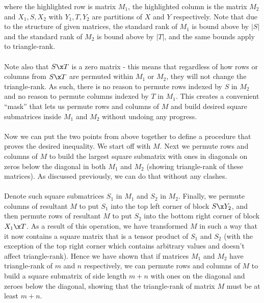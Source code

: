 \documentclass{article}
\begin{document}
\begin{enumerate}
\begin{enumerate}
            where the highlighted row is matrix $M_1$, the highlighted column
            is the matrix $M_2$ and $X_1, S, X_2$ with $Y_1, T, Y_2$ are
            partitions of $X$ and $Y$ respectively. Note that due to the
            structure of given matrices, the standard rank of $M_1$ is bound
            above by $|S|$ and the standard rank of $M_2$ is bound above by
            $|T|$, and the same bounds apply to triangle-rank.
            \\\\
            Note also that $S \x T$ is a zero matrix - this means that
            regardless of how rows or columns from $S \x T$ are permuted within
            $M_1$ or $M_2$, they will not change the triangle-rank. As such,
            there is no reason to permute rows indexed by $S$ in $M_2$ and no
            reason to permute columns indexed by $T$ in $M_1$. This creates a
            convenient ``mask'' that lets us permute rows and columns of $M$
            and build desired square submatrices inside $M_1$ and $M_2$ without 
            undoing any progress.
            \\\\
            Now we can put the two points from above together to define a
            procedure that proves the desired inequality. We start off with
            $M$. Next we permute rows and columns of $M$ to build the largest
            square submatrix with ones in diagonals on zeros below the diagonal
            in both $M_1$ and $M_2$ (showing triangle-rank of these
            matrices). As discussed previously, we can do that without any
            clashes.
            \\\\
            Denote such square submatrices $S_1$ in $M_1$ and $S_2$ in $M_2$.
            Finally, we permute columns of resultant $M$ to put $S_1$ into the
            top left corner of block $S \x Y_2$, and then permute rows of
            resultant $M$ to put $S_2$ into the bottom right corner of block
            $X_1 \x T$. As a result of this operation, we have transformed $M$
            in such a way that it now contains a square matrix that is a tensor
            product of $S_1$ and $S_2$ (with the exception of the top right
            corner which contains arbitrary values and doesn't affect
            triangle-rank). Hence we have shown that if matrices $M_1$ and
            $M_2$ have triangle-rank of $m$ and $n$ respectively, we can
            permute rows and columns of $M$ to build a square submatrix of side
            length $m + n$ with ones on the diagonal and zeroes below the
            diagonal, showing that the triangle-rank of matrix $M$ must be at
            least $m + n$.


\end{enumerate}
\end{enumerate}
\end{document}
